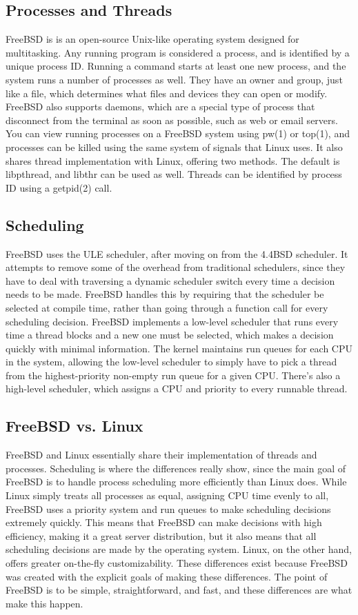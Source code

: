 \documentclass[draftclsnofoot,onecolumn,journal,letterpaper,10pt]{IEEEtran}
\begin{document}
\subsection{Processes and Threads}
FreeBSD is is an open-source Unix-like operating system designed for multitasking.  Any running program is considered a process, and is identified by a unique process ID. Running a command starts at least one new process, and the system runs a number of processes as well. They have an owner and group, just like a file, which determines what files and devices they can open or modify. FreeBSD also supports daemons, which are a special type of process that disconnect from the terminal as soon as possible, such as web or email servers. You can view running processes on a FreeBSD system using pw(1) or top(1), and processes can be killed using the same system of signals that Linux uses. It also shares thread implementation with Linux, offering two methods. The default is libpthread, and libthr can be used as well. Threads can be identified by process ID using a getpid(2) call\cite{bsdprocess}. 

\subsection{Scheduling}
FreeBSD uses the ULE scheduler, after moving on from the 4.4BSD scheduler. It attempts to remove some of the overhead from traditional schedulers, since they have to deal with traversing a dynamic scheduler switch every time a decision needs to be made. FreeBSD handles this by requiring that the scheduler be selected at compile time, rather than going through a function call for every scheduling decision. FreeBSD implements a low-level scheduler that runs every time a thread blocks and a new one must be selected, which makes a decision quickly with minimal information. The kernel maintains run queues for each CPU in the system, allowing the low-level scheduler to simply have to pick a thread from the highest-priority non-empty run queue for a given CPU. There's also a high-level scheduler, which assigns a CPU and priority to every runnable thread\cite{bsdschedule}. 

\subsection{FreeBSD vs. Linux}
FreeBSD and Linux essentially share their implementation of threads and processes. Scheduling is where the differences really show, since the main goal of FreeBSD is to handle process scheduling more efficiently than Linux does. While Linux simply treats all processes as equal, assigning CPU time evenly to all, FreeBSD uses a priority system and run queues to make scheduling decisions extremely quickly. This means that FreeBSD can make decisions with high efficiency, making it a great server distribution, but it also means that all scheduling decisions are made by the operating system. Linux, on the other hand, offers greater on-the-fly customizability. These differences exist because FreeBSD was created with the explicit goals of making these differences. The point of FreeBSD is to be simple, straightforward, and fast, and these differences are what make this happen.
  
\pagebreak
\nocite{*} %


\end{document}
